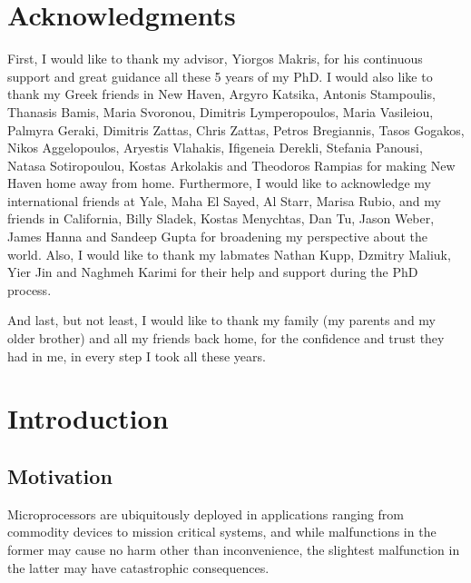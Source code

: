 \documentclass[12pt]{yalephd}
\begin{document}
\tableofcontents

\listoffigures

\listoftables

\chapter*{Acknowledgments}

First, I would like to thank my advisor, Yiorgos Makris, for his continuous support and great guidance all these 5 years of my PhD. I would also like to thank my Greek friends in New Haven, Argyro Katsika, Antonis Stampoulis, Thanasis Bamis, Maria Svoronou, Dimitris Lymperopoulos, Maria Vasileiou,  Palmyra Geraki, Dimitris Zattas, Chris Zattas, Petros Bregiannis, Tasos Gogakos, Nikos Aggelopoulos, Aryestis Vlahakis, Ifigeneia Derekli, Stefania Panousi, Natasa Sotiropoulou, Kostas Arkolakis and Theodoros Rampias for making New Haven home away from home. Furthermore, I would like to acknowledge my international friends at Yale, Maha El Sayed, Al Starr, Marisa Rubio, and my friends in California, Billy Sladek, Kostas Menychtas, Dan Tu, Jason Weber, James Hanna and Sandeep Gupta for broadening my perspective about the world. Also, I would like to thank my labmates Nathan Kupp, Dzmitry Maliuk, Yier Jin and Naghmeh Karimi for their help and support during the PhD process. 

And last, but not least, I would like to thank my family (my parents and my older brother) and all my friends back home, for the confidence and trust they had in me, in every step I took all these years. 


\mainmatter

\chapter{Introduction}

\section{Motivation}

Microprocessors are ubiquitously deployed in applications ranging from commodity devices to mission critical systems, and while malfunctions in the former may cause no harm other than inconvenience, the slightest malfunction in the latter may have catastrophic consequences. 
\end{document}
